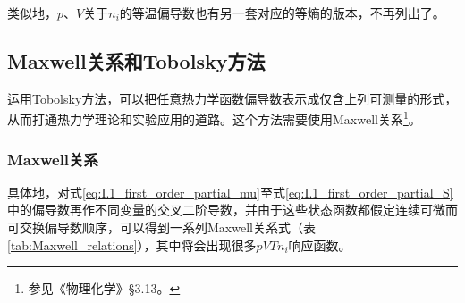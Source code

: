\documentclass[main.tex]{subfiles}
\begin{document}
类似地，$p$、$V$关于$n_i$的等温偏导数也有另一套对应的等熵的版本，不再列出了。

\subsection{Maxwell关系和Tobolsky方法}
运用Tobolsky方法\cite{Tobolsky1942}，可以把任意热力学函数偏导数表示成仅含上列可测量的形式，从而打通热力学理论和实验应用的道路。这个方法需要使用Maxwell关系\footnote{参见《物理化学》\S 3.13。}。

\subsubsection{Maxwell关系}
具体地，对式\eqref{eq:I.1_first_order_partial_mu}至式\eqref{eq:I.1_first_order_partial_S}中的偏导数再作不同变量的交叉二阶导数，并由于这些状态函数都假定连续可微而可交换偏导数顺序，可以得到一系列Maxwell关系式（表\ref{tab:Maxwell_relations}），其中将会出现很多$pVTn_i$响应函数。
\end{document}
